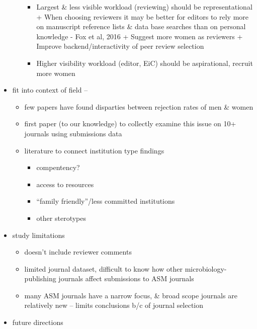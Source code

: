 \documentclass[11pt,]{article}
\providecommand{\tightlist}{%
  \setlength{\itemsep}{0pt}\setlength{\parskip}{0pt}}
\begin{document}
\begin{itemize}
\begin{itemize}
    \begin{itemize}
    \tightlist
    \item
      Largest \& less visible workload (reviewing) should be
      representational + When choosing reviewers it may be better for
      editors to rely more on manuscript reference lists \& data base
      searches than on personal knowledge - Fox et al, 2016 + Suggest
      more women as reviewers + Improve backend/interactivity of peer
      review selection
    \item
      Higher visibility workload (editor, EiC) should be aspirational,
      recruit more women
    \end{itemize}
  \end{itemize}
\item
  fit into context of field --

  \begin{itemize}
  \tightlist
  \item
    few papers have found disparties between rejection rates of men \&
    women
  \item
    first paper (to our knowledge) to collectly examine this issue on
    10+ journals using submissions data
  \item
    literature to connect institution type findings

    \begin{itemize}
    \tightlist
    \item
      compentency?
    \item
      access to resources
    \item
      ``family friendly''/less committed institutions
    \item
      other sterotypes
    \end{itemize}
  \end{itemize}
\item
  study limitations

  \begin{itemize}
  \tightlist
  \item
    doesn't include reviewer comments
  \item
    limited journal dataset, difficult to know how other
    microbiology-publishing journals affect submissions to ASM journals
  \item
    many ASM journals have a narrow focus, \& broad scope journals are
    relatively new -- limits conclusions b/c of journal selection
  \end{itemize}
\item
  future directions


\end{itemize}
\end{document}
